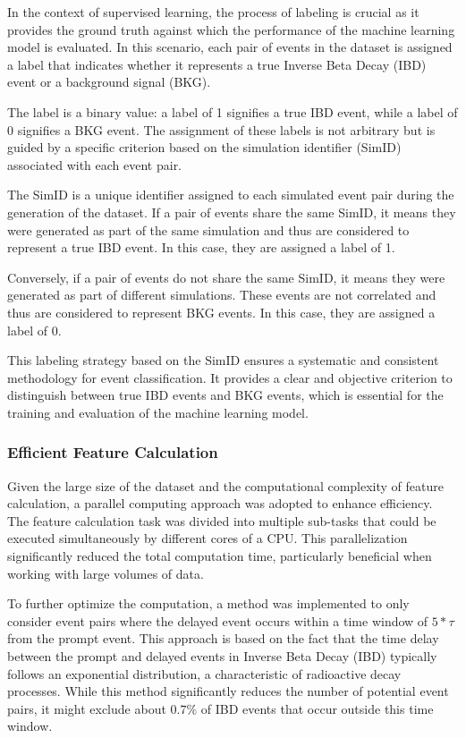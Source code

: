 In the context of supervised learning, the process of labeling is crucial as it provides the ground truth against which the performance of the machine learning model is evaluated. In this scenario, each pair of events in the dataset is assigned a label that indicates whether it represents a true Inverse Beta Decay (IBD) event or a background signal (BKG).

The label is a binary value: a label of 1 signifies a true IBD event, while a label of 0 signifies a BKG event. The assignment of these labels is not arbitrary but is guided by a specific criterion based on the simulation identifier (SimID) associated with each event pair.

The SimID is a unique identifier assigned to each simulated event pair during the generation of the dataset. If a pair of events share the same SimID, it means they were generated as part of the same simulation and thus are considered to represent a true IBD event. In this case, they are assigned a label of 1.

Conversely, if a pair of events do not share the same SimID, it means they were generated as part of different simulations. These events are not correlated and thus are considered to represent BKG events. In this case, they are assigned a label of 0.

This labeling strategy based on the SimID ensures a systematic and consistent methodology for event classification. It provides a clear and objective criterion to distinguish between true IBD events and BKG events, which is essential for the training and evaluation of the machine learning model.


\subsubsection*{Efficient Feature Calculation}
Given the large size of the dataset and the computational complexity of feature calculation, a parallel computing approach was adopted to enhance efficiency. The feature calculation task was divided into multiple sub-tasks that could be executed simultaneously by different cores of a CPU. This parallelization significantly reduced the total computation time, particularly beneficial when working with large volumes of data.


To further optimize the computation, a method was implemented to only consider event pairs where the delayed event occurs within a time window of $5*\tau$ from the prompt event. This approach is based on the fact that the time delay between the prompt and delayed events in Inverse Beta Decay (IBD) typically follows an exponential distribution, a characteristic of radioactive decay processes. While this method significantly reduces the number of potential event pairs, it might exclude about $0.7\%$ of IBD events that occur outside this time window. 

